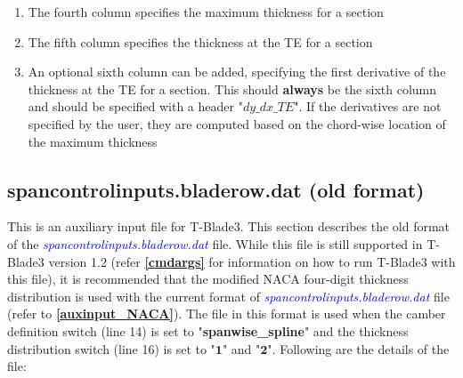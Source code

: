 \documentclass[8pt]{article}
\begin{document}
\begin{itemize}[leftmargin=*]
\begin{enumerate}[label=\alph*]
        \item The fourth column specifies the maximum thickness for a section
        \item The fifth column specifies the thickness at the TE for a section
        \item An optional sixth column can be added, specifying the first derivative of the thickness at the TE for a section. This should \textbf{always} be the sixth column and should be specified with a header "$dy\_dx\_TE$". If the derivatives are not specified by the user, they are computed based on the chord-wise location of the maximum thickness
    \end{enumerate}
\end{itemize}

\subsection{spancontrolinputs.bladerow.dat (old format)}\label{auxinput1}
\noindent
This is an auxiliary input file for T-Blade3. This section describes the old format of the \textit{\textcolor{blue}{spancontrolinputs.bladerow.dat}} file. While this file is still supported in T-Blade3 version 1.2 (refer \textbf{\ref{cmdargs}} for information on how to run T-Blade3 with this file), it is recommended that the modified NACA four-digit thickness distribution is used with the current format of \textit{\textcolor{blue}{spancontrolinputs.bladerow.dat}} file (refer to \textbf{\ref{auxinput_NACA}}). The file in this format is used when the camber definition switch (line 14) is set to "\textbf{spanwise\_spline}" and the thickness distribution switch (line 16) is set to "$\mathbf{1}$" and "$\mathbf{2}$". Following are the details of the file:
\end{document}
